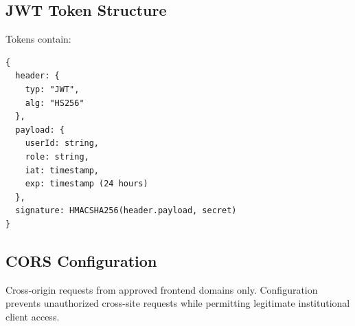 \documentclass[conference]{IEEEtran}
\begin{document}
\subsection{JWT Token Structure}
Tokens contain:
\begin{verbatim}
{
  header: {
    typ: "JWT",
    alg: "HS256"
  },
  payload: {
    userId: string,
    role: string,
    iat: timestamp,
    exp: timestamp (24 hours)
  },
  signature: HMACSHA256(header.payload, secret)
}
\end{verbatim}

\subsection{CORS Configuration}
Cross-origin requests from approved frontend domains only. Configuration prevents unauthorized cross-site requests while permitting legitimate institutional client access.
\end{document}
